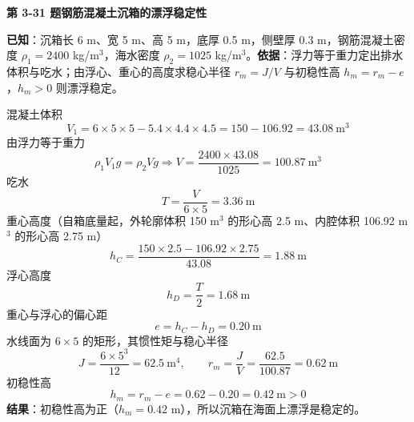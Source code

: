 \noindent\textbf{第 3-31 题\quad 钢筋混凝土沉箱的漂浮稳定性}

\begin{jie}
\textbf{已知}：沉箱长 6 m、宽 5 m、高 5 m，底厚 0.5 m，侧壁厚 0.3 m，钢筋混凝土密度 $\rho_1=2400$ kg/m$^3$，海水密度 $\rho_2=1025$ kg/m$^3$。\textbf{依据}：浮力等于重力定出排水体积与吃水；由浮心、重心的高度求稳心半径 $r_m=J/V$ 与初稳性高 $h_m=r_m-e$，$h_m>0$ 则漂浮稳定。

混凝土体积
\[ V_1=6\times5\times5-5.4\times4.4\times4.5=150-106.92=43.08\ \mathrm{m^3} \]
由浮力等于重力
\[ \rho_1V_1g=\rho_2Vg\Rightarrow V=\frac{2400\times43.08}{1025}=100.87\ \mathrm{m^3} \]
吃水
\[ T=\frac{V}{6\times5}=3.36\ \mathrm{m} \]
重心高度（自箱底量起，外轮廓体积 150 m$^3$ 的形心高 2.5 m、内腔体积 106.92 m$^3$ 的形心高 2.75 m）
\[ h_C=\frac{150\times2.5-106.92\times2.75}{43.08}=1.88\ \mathrm{m} \]
浮心高度
\[ h_D=\frac{T}{2}=1.68\ \mathrm{m} \]
重心与浮心的偏心距
\[ e=h_C-h_D=0.20\ \mathrm{m} \]
水线面为 $6\times5$ 的矩形，其惯性矩与稳心半径
\[ J=\frac{6\times5^3}{12}=62.5\ \mathrm{m^4},\qquad r_m=\frac{J}{V}=\frac{62.5}{100.87}=0.62\ \mathrm{m} \]
初稳性高
\[ h_m=r_m-e=0.62-0.20=0.42\ \mathrm{m}>0 \]
\textbf{结果}：初稳性高为正（$h_m=0.42$ m），所以沉箱在海面上漂浮是稳定的。
\end{jie}
